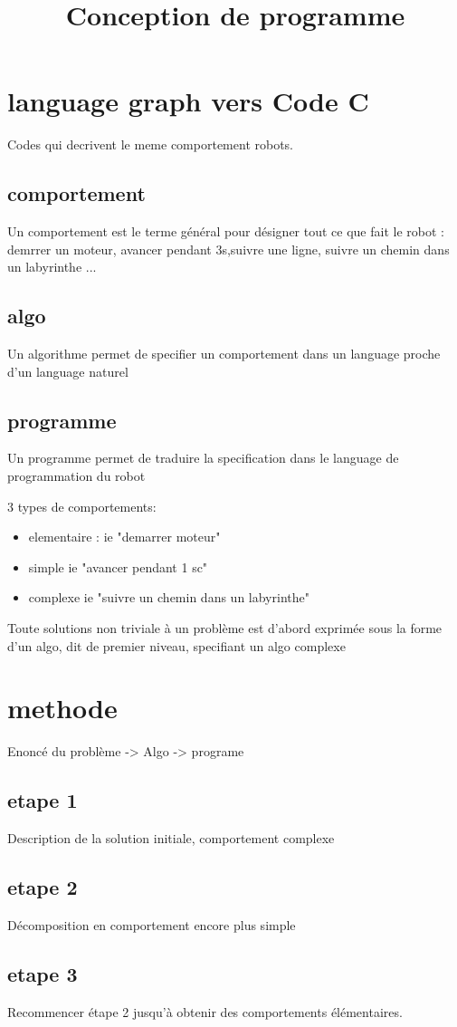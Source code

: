 \documentclass[a4paper]{article}
\title{Conception de programme}
\begin{document}
	\maketitle
	\newpage
	\tableofcontents
	\newpage
	\section{language graph vers Code C}
		Codes qui decrivent le meme comportement robots.
		\subsection{comportement}
			Un comportement est le terme général pour désigner tout ce que fait le robot : demrrer un moteur, avancer pendant 3s,suivre une ligne, suivre un chemin dans un labyrinthe ...
		\subsection{algo}
			Un algorithme permet de specifier un comportement dans un language proche d'un language naturel
		\subsection{programme}
			Un programme permet de traduire la specification dans le language de programmation du robot

		3 types de comportements:
		\begin{itemize}
			\item elementaire : ie "demarrer moteur"
			\item simple ie "avancer pendant 1 sc"
			\item complexe ie "suivre un chemin dans un labyrinthe"
		\end{itemize}

		Toute solutions non triviale à un problème est d'abord exprimée sous la forme d'un algo, dit de premier niveau, specifiant un algo complexe
	\section{methode}
		Enoncé du problème -> Algo -> programe
		\subsection{etape 1}
			Description de la solution initiale, comportement complexe
		\subsection{etape 2}
			Décomposition en comportement encore plus simple
		\subsection{etape 3}
			Recommencer étape 2 jusqu'à obtenir des comportements élémentaires.
\end{document}
